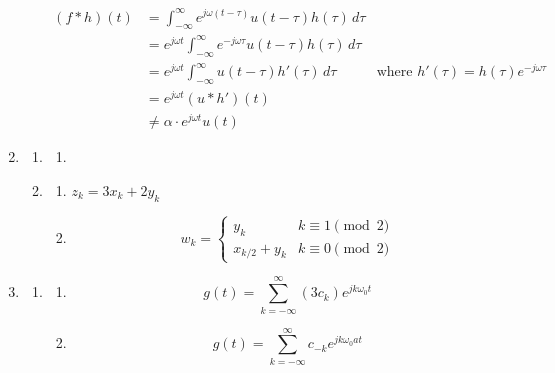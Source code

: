 \documentclass[12pt]{article}
\begin{document}
\begin{enumerate}
\begin{enumerate}
\begin{align*}
                              (f * h)(t)
                               & = \int_{-\infty}^{\infty} e^{j\omega(t-\tau)} u(t-\tau) h(\tau)\,d\tau             \\
                               & = e^{j \omega t} \int_{-\infty}^{\infty} e^{-j\omega\tau} u(t-\tau) h(\tau)\,d\tau \\
                               & = e^{j \omega t} \int_{-\infty}^{\infty} u(t-\tau) h'(\tau)\,d\tau
                               & \text{where }h'(\tau)=h(\tau)e^{-j\omega\tau}                                      \\
                               & = e^{j\omega t} (u * h')(t)                                                        \\
                               & \ne \alpha \cdot e^{j\omega t} u(t)
                        \end{align*}
            \end{enumerate}
      \item \begin{enumerate}
                  \item \begin{enumerate}
                              \item
                        \end{enumerate}
                  \item \begin{enumerate}
                              \item $z_k=3x_k+2y_k$
                              \item \[w_k=\begin{cases}
                                                y_k           & k \equiv 1 \pmod 2 \\
                                                x_{k/2} + y_k & k \equiv 0 \pmod 2
                                          \end{cases}\]
                        \end{enumerate}
            \end{enumerate}
      \item \begin{enumerate}
                  \item \begin{enumerate}
                              \item \[g(t)=\sum_{k=-\infty}^{\infty} (3c_k)e^{jk\omega_0t}\]
                              \item \[g(t)=\sum_{k=-\infty}^{\infty} c_{-k}e^{jk\omega_0at}\]

\end{enumerate}
\end{enumerate}
\end{enumerate}
\end{document}
